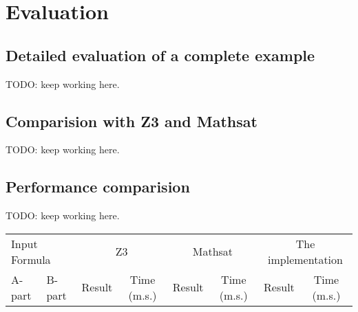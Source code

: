 \section{Evaluation}

\subsection{Detailed evaluation of a complete example}
TODO: keep working here.

\subsection{Comparision with Z3 and Mathsat}
TODO: keep working here.

\subsection{Performance comparision}
TODO: keep working here.

\begin{tabular}{llcccccc} \toprule
  \multicolumn{2}{l}{Input Formula} & \multicolumn{2}{c}{Z3}& \multicolumn{2}{c}{Mathsat}& \multicolumn{2}{c}{The implementation} 
  \\\cmidrule(lr){1-2}\cmidrule(lr){3-4}\cmidrule(lr){5-6}\cmidrule(lr){7-8}
  A-part & B-part & Result & Time (m.s.) & Result & Time (m.s.) & Result & Time (m.s.) \\
  
\end{tabular}

